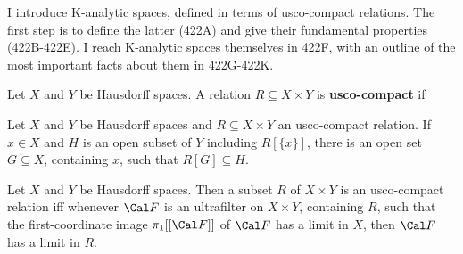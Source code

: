 
\def\NN{\BbbN^{\Bbb N}}

\def\chaptername{Descriptive set theory}
\def\sectionname{K-analytic spaces}


I introduce K-analytic spaces, defined in terms of usco-compact
relations.   The first step is to define the latter (422A) and give
their fundamental properties (422B-422E).   I reach K-analytic spaces
themselves in 422F, with an outline of the most important facts about
them in 422G-422K.

 Let $X$ and $Y$ be Hausdorff spaces.   A
relation $R\subseteq X\times Y$ is {\bf usco-compact} if




 Let $X$ and $Y$ be Hausdorff spaces and
$R\subseteq X\times Y$ an usco-compact relation.   If $x\in X$ and
$H$ is an open subset of $Y$ including $R[\{x\}]$, there is an open set
$G\subseteq X$, containing $x$, such that $R[G]\subseteq H$.


 Let $X$ and $Y$ be Hausdorff spaces.   Then a
subset $R$ of $X\times Y$ is an usco-compact relation iff whenever
$\Cal F$ is an ultrafilter on $X\times Y$, containing $R$, such that the
first-coordinate image
$\pi_1[[\Cal F]]$ of $\Cal F$ has a limit in $X$, then $\Cal F$ has a
limit in $R$.

